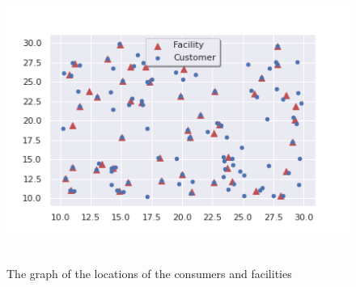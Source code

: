 \documentclass[12pt]{article}
\begin{document}
\begin{figure}[ht] 
    \centering
    \includegraphics[height=25em]{ala_squared_2.png}
    \caption{The graph of the locations of the consumers and facilities}
\end{figure}
\end{document}
